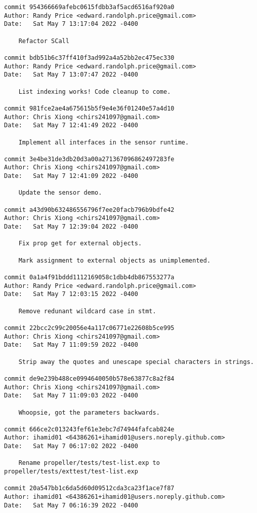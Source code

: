 {\begin{verbatim}
commit 954366669afebc0615fdbb3af5acd6516af920a0
Author: Randy Price <edward.randolph.price@gmail.com>
Date:   Sat May 7 13:17:04 2022 -0400

    Refactor SCall

commit bdb51b6c37ff410f3ad992a4a52bb2ec475ec330
Author: Randy Price <edward.randolph.price@gmail.com>
Date:   Sat May 7 13:07:47 2022 -0400

    List indexing works! Code cleanup to come.

commit 981fce2ae4a675615b5f9e4e36f01240e57a4d10
Author: Chris Xiong <chirs241097@gmail.com>
Date:   Sat May 7 12:41:49 2022 -0400

    Implement all interfaces in the sensor runtime.

commit 3e4be31de3db20d3a00a271367096862497283fe
Author: Chris Xiong <chirs241097@gmail.com>
Date:   Sat May 7 12:41:09 2022 -0400

    Update the sensor demo.

commit a43d90b632486556796f7ee20facb796b9bdfe42
Author: Chris Xiong <chirs241097@gmail.com>
Date:   Sat May 7 12:39:04 2022 -0400

    Fix prop get for external objects.
    
    Mark assignment to external objects as unimplemented.

commit 0a1a4f91bddd1112169058c1dbb4db867553277a
Author: Randy Price <edward.randolph.price@gmail.com>
Date:   Sat May 7 12:03:15 2022 -0400

    Remove redunant wildcard case in stmt.

commit 22bcc2c99c20056e4a117c06771e22608b5ce995
Author: Chris Xiong <chirs241097@gmail.com>
Date:   Sat May 7 11:09:59 2022 -0400

    Strip away the quotes and unescape special characters in strings.

commit de9e239b488ce0994640050b578e63877c8a2f84
Author: Chris Xiong <chirs241097@gmail.com>
Date:   Sat May 7 11:09:03 2022 -0400

    Whoopsie, got the parameters backwards.

commit 666ce2c013243fef61e3ebc7d74944fafcab824e
Author: ihamid01 <64386261+ihamid01@users.noreply.github.com>
Date:   Sat May 7 06:17:02 2022 -0400

    Rename propeller/tests/test-list.exp to propeller/tests/exttest/test-list.exp

commit 20a547bb1c6da5d60d09512cda3ca23f1ace7f87
Author: ihamid01 <64386261+ihamid01@users.noreply.github.com>
Date:   Sat May 7 06:16:39 2022 -0400


\end{verbatim}}

